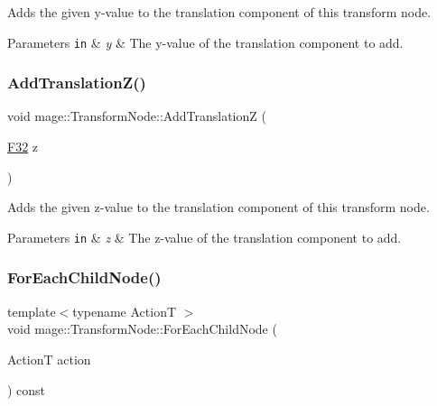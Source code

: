 Adds the given y-\/value to the translation component of this transform node.


\begin{DoxyParams}[1]{Parameters}
\mbox{\tt in}  & {\em y} & The y-\/value of the translation component to add. \\
\hline
\end{DoxyParams}
\hypertarget{structmage_1_1_transform_node_a5baeb0e01284996939f5338c8d3fe2dc}{}\label{structmage_1_1_transform_node_a5baeb0e01284996939f5338c8d3fe2dc} 
\subsubsection{\texorpdfstring{Add\+Translation\+Z()}{AddTranslationZ()}}
{\footnotesize\ttfamily void mage\+::\+Transform\+Node\+::\+Add\+TranslationZ (\begin{DoxyParamCaption}\item[{\hyperlink{namespacemage_aa97e833b45f06d60a0a9c4fc22ae02c0}{F32}}]{z }\end{DoxyParamCaption})\hspace{0.3cm}{\ttfamily [noexcept]}}

Adds the given z-\/value to the translation component of this transform node.


\begin{DoxyParams}[1]{Parameters}
\mbox{\tt in}  & {\em z} & The z-\/value of the translation component to add. \\
\hline
\end{DoxyParams}
\hypertarget{structmage_1_1_transform_node_a3dd36b373d27e3526df562ba899f721f}{}\label{structmage_1_1_transform_node_a3dd36b373d27e3526df562ba899f721f} 
\subsubsection{\texorpdfstring{For\+Each\+Child\+Node()}{ForEachChildNode()}}
{\footnotesize\ttfamily template$<$typename ActionT $>$ \\
void mage\+::\+Transform\+Node\+::\+For\+Each\+Child\+Node (\begin{DoxyParamCaption}\item[{ActionT}]{action }\end{DoxyParamCaption}) const\hspace{0.3cm}{\ttfamily [private]}}


